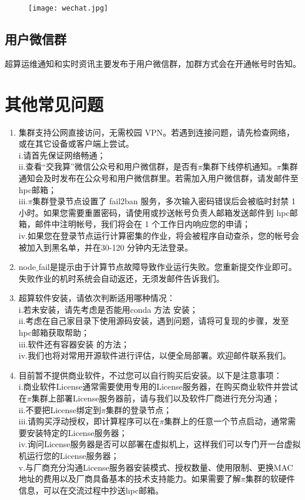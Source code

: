 \documentclass[cn, 12pt, hang, black, chinese]{elegantbook}
\begin{document}
\begin{figure}[!htb]
\centering
\texttt{[image: wechat.jpg]}
\end{figure}

\subsection*{用户微信群}
超算运维通知和实时资讯主要发布于用户微信群，加群方式会在开通帐号时告知。

\section{其他常见问题}
\begin{enumerate}[itemsep=1.3ex]
  \item {}
    集群支持公网直接访问，无需校园 VPN。若遇到连接问题，请先检查网络，或在其它设备或客户端上尝试。\\i.请首先保证网络畅通；\\ii.查看“交我算”微信公众号和用户微信群，是否有$\pi$集群下线停机通知。$\pi$集群通知会及时发布在公众号和用户微信群里。若需加入用户微信群，请发邮件至 hpc邮箱；\\iii.$\pi$集群登录节点设置了 fail2ban 服务，多次输入密码错误后会被临时封禁 1 小时。如果您需要重置密码，请使用或抄送帐号负责人邮箱发送邮件到 hpc邮箱，邮件中注明帐号，我们将会在 1 个工作日内响应您的申请；\\iv.如果您在登录节点运行计算密集的作业，将会被程序自动查杀，您的帐号会被加入到黑名单，并在30-120 分钟内无法登录。
  \item {}
    node$\_$fail是提示由于计算节点故障导致作业运行失败。您重新提交作业即可。失败作业的机时系统会自动返还，无须发邮件告诉我们。
  \item {}
    超算软件安装，请依次判断适用哪种情况：\\i.若未安装，请先考虑是否能用conda 方法 安装；\\ii.考虑在自己家目录下使用源码安装，遇到问题，请将可复现的步骤，发至hpc邮箱获取帮助；\\iii.软件还有容器安装 的方法；\\iv.我们也将对常用开源软件进行评估，以便全局部署。欢迎邮件联系我们。
  \item {}
    目前暂不提供商业软件，不过您可以自行购买后安装。以下是注意事项：\\i.商业软件License通常需要使用专用的License服务器，在购买商业软件并尝试在$\pi$集群上部署License服务器前，请与我们以及软件厂商进行充分沟通；\\ii.不要把License绑定到$\pi$集群的登录节点；\\iii.请购买浮动授权，即计算程序可以在$\pi$集群上的任意一个节点启动，通常需要安装特定的License服务器；\\iv.询问License服务器是否可以部署在虚拟机上，这样我们可以专门开一台虚拟机运行您的License服务器；\\v.与厂商充分沟通License服务器安装模式、授权数量、使用限制、更换MAC地址的费用以及厂商具备基本的技术支持能力。如果需要了解$\pi$集群的软硬件信息，可以在交流过程中抄送hpc邮箱。

\end{enumerate}
\end{document}
